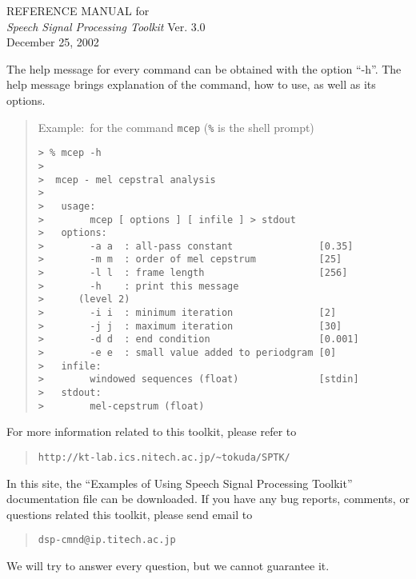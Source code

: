 \documentclass[12pt]{book}
\begin{document}
\begin{titlepage}
\vspace*{\fill}
 \begin{center}
	\LARGE
	{\rm REFERENCE MANUAL for} \\
	{\sl Speech Signal Processing Toolkit} Ver. 3.0 \\[10mm]
	{\rm December 25, 2002}
 \end{center}
\vspace*{\fill}
\vspace*{\fill}

\newpage
\thispagestyle{empty}
\vspace*{\fill}
\noindent
The help message for every command can be obtained
with the option ``-h''.
The help message brings explanation of the command, how to use, 
as well as its options.

\begin{quote}
 Example:~for the command \verb!mcep! (\verb!%! is the shell prompt)
 \begin{verbatim}
> % mcep -h
> 
>  mcep - mel cepstral analysis
> 
>   usage:
>        mcep [ options ] [ infile ] > stdout
>   options:
>        -a a  : all-pass constant               [0.35]
>        -m m  : order of mel cepstrum           [25]
>        -l l  : frame length                    [256]
>        -h    : print this message
>      (level 2)
>        -i i  : minimum iteration               [2]
>        -j j  : maximum iteration               [30]
>        -d d  : end condition                   [0.001]
>        -e e  : small value added to periodgram [0]
>   infile:
>        windowed sequences (float)              [stdin]
>   stdout:
>        mel-cepstrum (float)
 \end{verbatim}
\end{quote}
\vspace{\baselineskip}
\noindent
For more information related to this toolkit,
please refer to
\begin{quote}
\verb!http://kt-lab.ics.nitech.ac.jp/~tokuda/SPTK/!
\end{quote}
In this site, the
``Examples of Using Speech Signal Processing Toolkit''
documentation file can be downloaded.
If you have any bug reports, comments, or questions
related this toolkit, please send email to
\begin{quote}
\verb!dsp-cmnd@ip.titech.ac.jp!
\end{quote}
We will try to answer every question, but we cannot guarantee it.
\end{titlepage}
\end{document}

